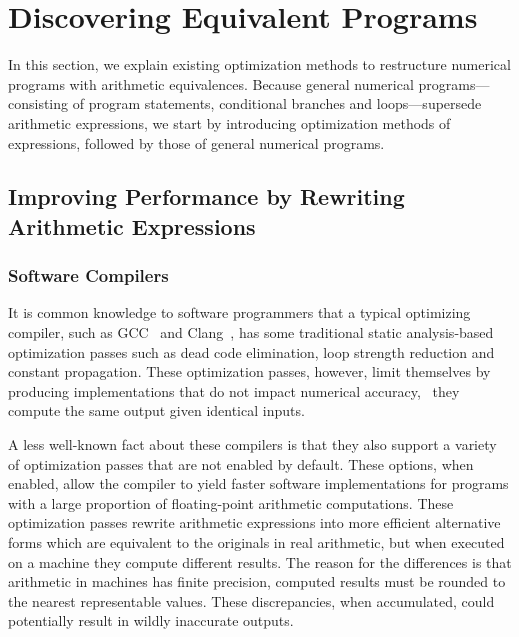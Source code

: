 \section{Discovering Equivalent Programs}
\label{bg:sec:discovering_equivalent_programs}

In this section, we explain existing optimization methods to restructure
numerical programs with arithmetic equivalences.  Because general numerical
programs---consisting of program statements, conditional branches and
loops---supersede arithmetic expressions, we start by introducing optimization
methods of expressions, followed by those of general numerical programs.


\subsection{Improving Performance by Rewriting Arithmetic Expressions}
\label{bg:sub:performance}

\subsubsection{Software Compilers}

It is common knowledge to software programmers that a typical optimizing
compiler, such as GCC~\cite{gcc} and Clang~\cite{clang}, has some traditional
static analysis-based optimization passes such as dead code elimination, loop
strength reduction and constant propagation.  These optimization passes,
however, limit themselves by producing implementations that do not impact
numerical accuracy, \ie~they compute the same output given identical inputs.

A less well-known fact about these compilers is that they also support a
variety of optimization passes that are not enabled by default.  These options,
when enabled, allow the compiler to yield faster software implementations for
programs with a large proportion of floating-point arithmetic computations.
These optimization passes rewrite arithmetic expressions into more efficient
alternative forms which are equivalent to the originals in real arithmetic,
but when executed on a machine they compute different results.  The reason
for the differences is that arithmetic in machines has finite precision,
computed results must be rounded to the nearest representable values.  These
discrepancies, when accumulated, could potentially result in wildly inaccurate
outputs.

